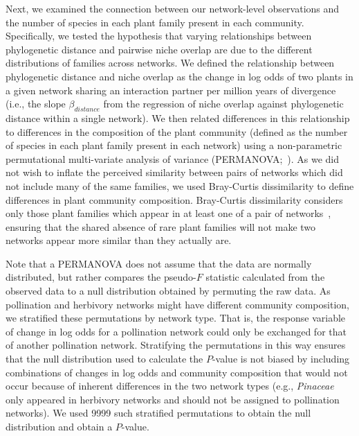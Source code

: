\documentclass[12pt]{article}
\begin{document}
\begin{spacing}{1.5}
    Next, we examined the connection between our network-level observations
    and the number of species in each plant family present in each community.
    Specifically, we tested the hypothesis that
    varying relationships between phylogenetic distance and
    pairwise niche overlap are due to the different distributions 
    of families across networks. We defined the relationship between
    phylogenetic distance and niche overlap as the change in 
    log odds of two plants in a given network sharing an interaction 
    partner per million years of divergence (i.e., the slope $\beta_{distance}$ from the 
    regression of niche overlap against phylogenetic distance within
    a single network). We then related differences in this relationship
    to differences in the composition of the plant community (defined as the number of species in each plant family present in each network) using a non-parametric permutational multi-variate 
    analysis of variance (PERMANOVA;~\citealp{Anderson2001}).
    As we did not wish to inflate the perceived similarity between
    pairs of networks which did not include many of the same families,
    we used Bray-Curtis dissimilarity to define differences in plant
    community composition. Bray-Curtis dissimilarity considers only
    those plant families which appear in at least one of a pair of
    networks~\citep{Anderson2001,Cirtwill2015}, ensuring that the
    shared absence of rare plant families will not make 
    two networks appear more similar than they actually are. 


    Note that a PERMANOVA does not assume that the data are 
    normally distributed, but rather compares the pseudo-$F$ 
    statistic calculated from the observed data to a null 
    distribution obtained by permuting the raw data. As 
    pollination and herbivory networks might have different
    community composition, we stratified these permutations
    by network type. That is, the response variable of change in log odds for a pollination
    network could only be exchanged for that of another pollination
    network. Stratifying the permutations in this way ensures that 
    the null distribution used to calculate the $P$-value is not 
    biased by including combinations of changes in log odds and 
    community composition that would not occur because of inherent 
    differences in the two network types (e.g., \emph{Pinaceae} 
    only appeared in herbivory networks and should not be assigned 
    to pollination networks). We used 9999 such stratified permutations 
    to obtain the null distribution and obtain a $P$-value.


\end{spacing}
\end{document}
